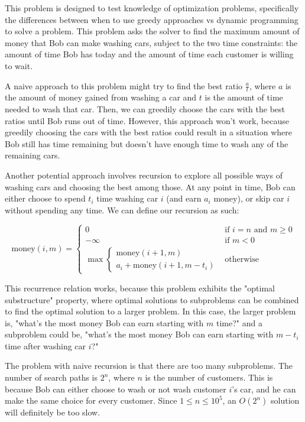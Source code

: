 This problem is designed to test knowledge of optimization problems, specifically the differences between when to use greedy approaches vs dynamic programming to solve a problem. This problem asks the solver to find the maximum amount of money that Bob can make washing cars, subject to the two time constraints: the amount of time Bob has today and the amount of time each customer is willing to wait.

A naive approach to this problem might try to find the best ratio $\frac{a}{t}$, where $a$ is the amount of money gained from washing a car and $t$ is the amount of time needed to wash that car. Then, we can greedily choose the cars with the best ratios until Bob runs out of time. However, this approach won't work, because greedily choosing the cars with the best ratios could result in a situation where Bob still has time remaining but doesn't have enough time to wash any of the remaining cars. 

Another potential approach involves recursion to explore all possible ways of washing cars and choosing the best among those. At any point in time, Bob can either choose to spend $t_i$ time washing car $i$ (and earn $a_i$ money), or skip car $i$ without spending any time. We can define our recursion as such: 

$$\text{money}(i, m) =
\begin{cases}
	0 & \text{if } i = n \text{ and } m \geq 0 \\
	-\infty & \text{if } m < 0 \\
	\max \begin{cases}
		\text{money}(i + 1, m) \\
		a_i + \text{money}(i + 1, m - t_i)
	\end{cases} & \text{otherwise}
\end{cases}$$

This recurrence relation works, because this problem exhibits the "optimal substructure" property, where optimal solutions to subproblems can be combined to find the optimal solution to a larger problem. In this case, the larger problem is, "what's the most money Bob can earn starting with $m$ time?" and a subproblem could be, "what's the most money Bob can earn starting with $m - t_i$ time after washing car $i$?"

The problem with naive recursion is that there are too many subproblems. The number of search paths is $2^n$, where $n$ is the number of customers. This is because Bob can either choose to wash or not wash customer $i$'s car, and he can make the same choice for every customer. Since $1 \leq n \leq 10^5$, an $O(2^n)$ solution will definitely be too slow.

